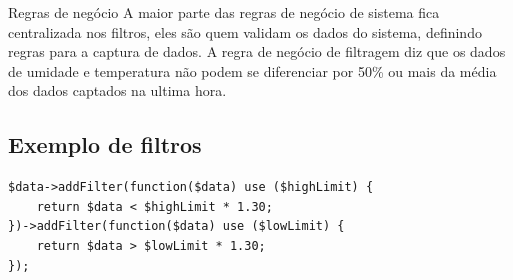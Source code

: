 \documentclass[aspectratio=43]{beamer}
\begin{document}
\begin{frame}{Regras de negócio}
A maior parte das regras de negócio de sistema fica centralizada nos filtros, eles são quem validam os dados do sistema, definindo regras para a captura de dados.
A regra de negócio de filtragem diz que os dados de umidade e temperatura não podem se diferenciar por 50\% ou mais da média dos dados captados na ultima hora.
\end{frame}

\begin{frame}[fragile=singleslide]
\section{Exemplo de filtros}

\begin{verbatim}
$data->addFilter(function($data) use ($highLimit) {
    return $data < $highLimit * 1.30;
})->addFilter(function($data) use ($lowLimit) {
    return $data > $lowLimit * 1.30;
});
\end{verbatim}
\end{frame}


% 

\end{document}
